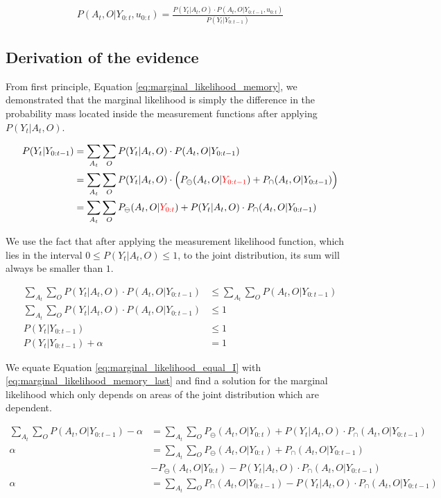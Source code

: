 \begin{align}
 P(A_t,O|Y_{0:t},u_{0:t}) = \frac{P(Y_t|A_{t},O) \cdot P(A_{t},O|Y_{0:t-1},u_{0:t})}{P(Y_t|Y_{0:t-1})}
\end{align}


\subsection{Derivation of the evidence}\label{appendix:evidence}

From first principle, Equation \ref{eq:marginal_likelihood_memory}, we demonstrated that the marginal likelihood is simply the difference
in the probability mass located inside the measurement functions after applying $P(Y_t|A_t,O)$.

\begin{align} \label{eq:marginal_likelihood_memory}
 P(Y_t|Y_{0:t-1}) &= \sum\limits_{A_t}\sum\limits_{O} P(Y_t|A_t,O)\cdot P(A_t,O|Y_{0:t-1}) \\
		  &= \sum\limits_{A_t}\sum\limits_{O} P(Y_t|A_t,O)\cdot \Big(P_{\ominus}(A_t,O|{\color{red}Y_{0:t-1}}) + P_{\cap}(A_t,O|Y_{0:t-1})\Big)\\
		  &= \sum\limits_{A_t}\sum\limits_{O} P_{\ominus}(A_t,O|{\color{red}Y_{0:t}}) + P(Y_t|A_t,O)\cdot P_{\cap}(A_t,O|Y_{0:t-1}) \label{eq:marginal_likelihood_memory_last}
\end{align}

We use the fact that after applying the measurement likelihood function, which lies in the interval $0 \leq P(Y_t|A_t,O) \leq 1$, 
to the joint distribution, its sum will always be smaller than $1$.

\begin{align}
  \sum\limits_{A_t}\sum\limits_{O} P(Y_t|A_t,O) \cdot P(A_t,O|Y_{0:t-1})  &\leq \sum\limits_{A_t}\sum\limits_{O} P(A_t,O|Y_{0:t-1}) \\
  \sum\limits_{A_t}\sum\limits_{O} P(Y_t|A_t,O) \cdot P(A_t,O|Y_{0:t-1}) &\leq 1 \\
  P(Y_t|Y_{0:t-1}) &\leq 1 \\
  P(Y_t|Y_{0:t-1}) + \alpha &= 1 \label{eq:marginal_likelihood_equal_I}
\end{align}

We equate Equation \ref{eq:marginal_likelihood_equal_I} with \ref{eq:marginal_likelihood_memory_last} and find a solution for the marginal likelihood which
only depends on areas of the joint distribution which are dependent.
		   
\begin{align}		  
 \sum\limits_{A_t}\sum\limits_{O} P(A_t,O|Y_{0:t-1}) - \alpha  &= \sum\limits_{A_t}\sum\limits_{O} P_{\ominus}(A_t,O|Y_{0:t}) + P(Y_t|A_t,O)\cdot P_{\cap}(A_t,O|Y_{0:t-1}) \\
   \alpha &= \sum\limits_{A_t}\sum\limits_{O}  P_{\ominus}(A_t,O|Y_{0:t}) + P_{\cap}(A_t,O|Y_{0:t-1})\\
     & - P_{\ominus}(A_t,O|Y_{0:t}) - P(Y_t|A_t,O)\cdot P_{\cap}(A_t,O|Y_{0:t-1}) \\
    \alpha &= \sum\limits_{A_t}\sum\limits_{O} P_{\cap}(A_t,O|Y_{0:t-1}) - P(Y_t|A_t,O)\cdot P_{\cap}(A_t,O|Y_{0:t-1}) \label{eq:marginal_likelihood_equal_I2}
\end{align}

